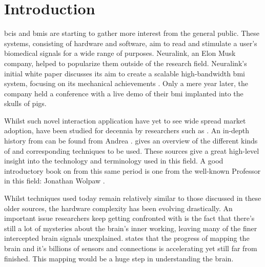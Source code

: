 

\chapter{Introduction}
\label{ch:introduction}

\Glspl{bci} and \glspl{bmi} are starting to gather more interest from the general public.
These systems, consisting of hardware and software, aim to read and stimulate a user's biomedical signals for a wide range of purposes.
Neuralink, an Elon Musk company, helped to popularize them outside of the research field.
Neuralink's initial white paper discusses its aim to create a scalable high-bandwidth \acrshort{bmi} system, focusing on its mechanical achievements \citep{neuralink_whitepaper}.
Only a mere year later, the company held a conference with a live demo of their \acrshort{bmi} implanted into the skulls of pigs.

Whilst such novel interaction application have yet to see wide spread market adoption,  have been studied for decennia by researchers such as \citet{early_bci}.
An in-depth history from  can be found from Andrea \citet{bci_history}.
\citet{bci_review} gives an overview of the different kinds of  and corresponding techniques to be used.
These sources give a great high-level insight into the technology and terminology used in this field.
A good introductory book on  from this same period is one from the well-known Professor in this field: Jonathan Wolpaw \citep{bci_book}.

Whilst techniques used today remain relatively similar to those discussed in these older sources, the hardware complexity has been evolving drastically.
An important issue researchers keep getting confronted with is the fact that there's still a lot of mysteries about the brain's inner working, leaving many of the finer intercepted brain signals unexplained.
\citet{brainmapping} states that the progress of mapping the brain and it's billions of sensors and connections is accelerating yet still far from finished.
This mapping would be a huge step in understanding the brain.

